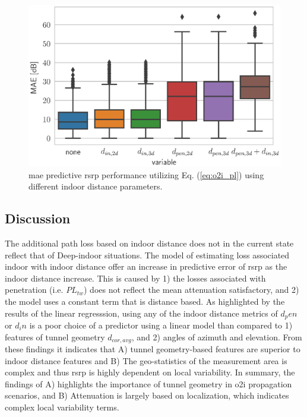 \begin{figure}
    \centering
    \includegraphics{chapters/part_pathloss/figures/outdoor_to_indoor/results/mae_boxplot.eps}
    \caption{\gls{mae} predictive \gls{rsrp} performance utilizing Eq. (\ref{eq:o2i_pl}) using different indoor distance parameters.}
    \label{fig:mae_boxplot_o2i_pl_in}
\end{figure}

\subsection{Discussion}
The additional path loss based on indoor distance does not in the current state reflect that of Deep-indoor situations. The model of estimating loss associated indoor with indoor distance offer an increase in predictive error of \gls{rsrp} as the indoor distance increase. This is caused by 1) the losses associated with penetration (i.e. $PL_{tw}$) does not reflect the mean attenuation satisfactory, and 2) the model uses a constant term that is distance based. As highlighted by the results of the linear regresssion, using any of the indoor distance metrics of $d_pen$ or $d_in$ is a poor choice of a predictor using a linear model than compared to 1) features of tunnel geometry $d_{cor,avg}$, and 2) angles of azimuth and elevation. From these findings it indicates that A) tunnel geometry-based features are superior to indoor distance features and B) The geo-statistics of the measurement area is complex and thus \gls{rsrp} is highly dependent on local variability. In summary, the findings of A) highlights the importance of tunnel geometry in \gls{o2i} propagation scenarios, and B) Attenuation is largely based on localization, which indicates complex local variability terms.


